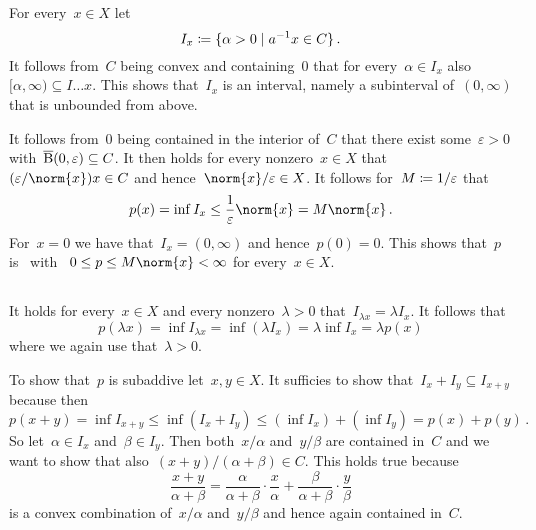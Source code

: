 \section{}





\subsection{}
For every~$x \in X$ let
\[
            I_x
  \defined  \{
              \alpha > 0
            \suchthat
              a^{-1} x \in C
            \} \,.
\]
It follows from~$C$ being convex and containing~$0$ that for every~$\alpha \in I_x$ also~$[\alpha,\infty) \subseteq I…x$.
This shows that~$I_x$ is an interval, namely a subinterval of~$(0,\infty)$ that is unbounded from above.

It follows from~$0$ being contained in the interior of~$C$ that there exist some~$\varepsilon > 0$ with~$\overline{\operatorname{B}}(0,\varepsilon) \subseteq C$.
It then holds for every nonzero~$x \in X$ that~$(\varepsilon/\norm{x}) x \in C$ and hence~$\norm{x}/\varepsilon \in X$.
It follows for~$M \coloneqq 1/\varepsilon$ that
\[
        p(x)
  =     \inf I_x
  \leq  \frac{1}{\varepsilon} \norm{x}
  =     M \norm{x} \,.
\]
For~$x = 0$ we have that~$I_x = (0,\infty)$ and hence~$p(0) = 0$.
This shows that~$p$ is~{\welldef} with ~$0 \leq p \leq M \norm{x} < \infty$ for every~$x \in X$.





\subsection{}

It holds for every~$x \in X$ and every nonzero~$\lambda > 0$ that~$I_{\lambda x} = \lambda I_x$.
It follows that
\[
    p(\lambda x)
  = \inf I_{\lambda x}
  = \inf (\lambda I_x)
  = \lambda \inf I_x
  = \lambda p(x)
\]
where we again use that~$\lambda > 0$.

To show that~$p$ is subaddive let~$x, y \in X$.
It sufficies to show that~$I_x + I_y \subseteq I_{x+y}$ because then
\[
        p(x+y)
  =     \inf I_{x+y}
  \leq  \inf (I_x + I_y)
  \leq  (\inf I_x) + (\inf I_y)
  =     p(x) + p(y) \,.
\]
So let~$\alpha \in I_x$ and~$\beta \in I_y$.
Then both~$x/\alpha$ and~$y/\beta$ are contained in~$C$ and we want to show that also~$(x+y)/(\alpha + \beta) \in C$.
This holds true because
\[
    \frac{x+y}{\alpha + \beta}
  =   \frac{\alpha}{\alpha + \beta} \cdot \frac{x}{\alpha}
    + \frac{\beta}{\alpha + \beta} \cdot \frac{y}{\beta}
\]
is a convex combination of~$x/\alpha$ and~$y/\beta$ and hence again contained in~$C$.





